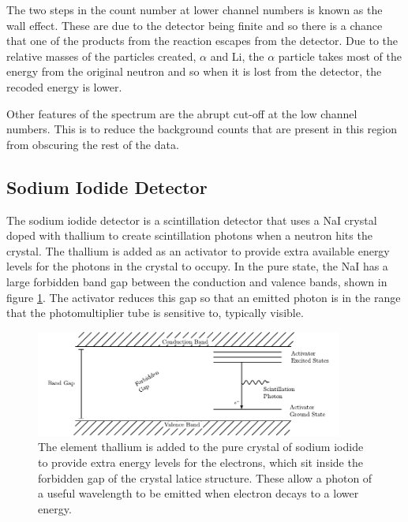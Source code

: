 The two steps in the count number at lower channel numbers is known as the wall effect. These are due to the detector being finite and so there is a chance that one of the products from the reaction escapes from the detector. Due to the relative masses of the particles created, $\alpha$ and Li, the $\alpha$ particle takes most of the energy from the original neutron and so when it is lost from the detector, the recoded energy is lower.

Other features of the spectrum are the abrupt cut-off at the low channel numbers. This is to reduce the background counts that are present in this region from obscuring the rest of the data. 


\subsection{Sodium Iodide Detector} %
\label{ssub:sodium_iodide_detector}
The sodium iodide detector is a scintillation detector that uses a NaI crystal doped with thallium to create scintillation photons when a neutron hits the crystal. The thallium is added as an activator to provide extra available energy levels for the photons in the crystal to occupy. In the pure state, the NaI has a large forbidden band gap between the conduction and valence bands, shown in figure \ref{fig:thaliumactivator}. The activator reduces this gap so that an emitted photon is in the range that the photomultiplier tube is sensitive to, typically visible.
\begin{figure}[ht]
	\centering
	\includegraphics[width=0.9\textwidth]{NaIbands.pdf}
	\caption{The element thallium is added to the pure crystal of sodium iodide to provide extra energy levels for the electrons, which sit inside the forbidden gap of the crystal latice structure. These allow a photon of a useful wavelength to be emitted when electron decays to a lower energy.\label{fig:thaliumactivator}}
\end{figure}

